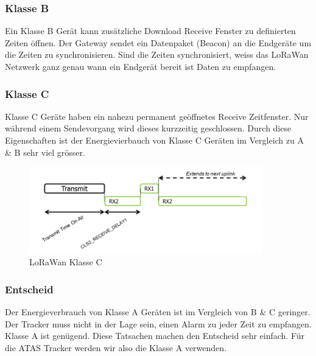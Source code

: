 \documentclass[11pt,english,german]{report}
\theoremstyle{definition}
\begin{document}
\subsubsection{Klasse B}
Ein Klasse B Gerät kann zusätzliche Download Receive Fenster zu definierten Zeiten öffnen. Der Gateway sendet ein Datenpaket (Beacon) an die Endgeräte um die Zeiten zu synchronisieren. Sind die Zeiten synchronisiert, weiss das LoRaWan Netzwerk ganz genau wann ein Endgerät bereit ist Daten zu empfangen. 

\newpage
\subsubsection{Klasse C}
Klasse C Geräte haben ein nahezu permanent geöffnetes Receive Zeitfenster. Nur während einem Sendevorgang wird dieses kurzzeitig geschlossen. Durch diese Eigenschaften ist der Energievierbauch von Klasse C Geräten im Vergleich zu A \& B sehr viel grösser.

\begin{figure}[H]
	\centering
	\includegraphics[width=0.9\textwidth]{img/lora/lorawan_class_c.png}
	\caption[LoRaWan Klasse C]
	{LoRaWan Klasse C}
\end{figure}

\subsubsection{Entscheid}
Der Energieverbrauch von Klasse A Geräten ist im Vergleich von B \& C geringer. Der Tracker muss nicht in der Lage sein, einen Alarm zu jeder Zeit zu empfangen. Klasse A ist genügend. Diese Tatsachen machen den Entscheid sehr einfach. Für die ATAS Tracker werden wir also die Klasse A verwenden. 

\newpage
\end{document}
